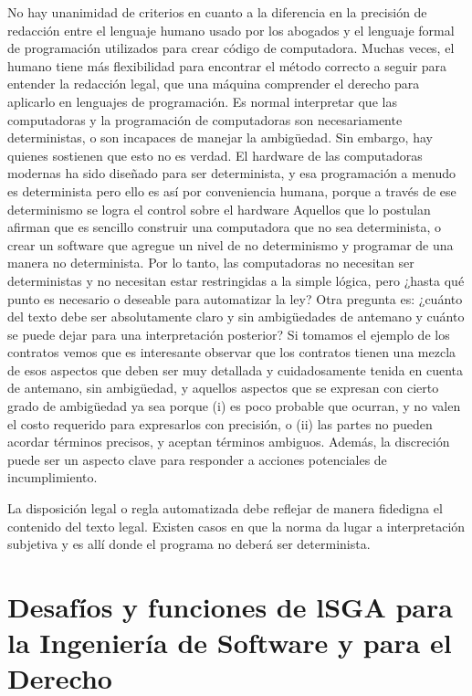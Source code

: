 \documentclass[12pt]{report} %
\begin{document}
No hay unanimidad de criterios en cuanto a la diferencia en la precisión de redacción entre el lenguaje humano usado por los abogados y el lenguaje formal de programación utilizados para crear código de computadora. Muchas veces, el humano tiene más flexibilidad para encontrar el método correcto a seguir para entender la redacción legal, que una máquina comprender el derecho para aplicarlo en lenguajes de programación. Es normal interpretar que las computadoras y la programación de computadoras son necesariamente deterministas, o son incapaces de manejar la ambigüedad. Sin embargo, hay quienes sostienen que esto no es verdad. El hardware de las computadoras modernas ha sido diseñado para ser determinista, y esa programación a menudo es determinista pero ello es así por conveniencia humana, porque a través de ese determinismo se logra el control sobre el hardware Aquellos que lo postulan afirman que es sencillo construir una computadora que no sea determinista, o crear un software que agregue un nivel de no determinismo y programar de una manera no determinista. Por lo tanto, las computadoras no necesitan ser deterministas y no necesitan estar restringidas a la simple lógica, pero ¿hasta qué punto es  necesario o deseable para automatizar la ley? Otra pregunta es: ¿cuánto del texto debe ser absolutamente claro y sin ambigüedades de antemano y cuánto se puede dejar para una interpretación posterior? Si tomamos el ejemplo de los contratos vemos que es interesante observar que los contratos tienen una mezcla de esos aspectos que deben ser muy detallada y cuidadosamente tenida en cuenta de antemano, sin ambigüedad, y aquellos aspectos que se expresan con cierto grado de ambigüedad ya sea porque (i) es poco probable que ocurran, y no valen el costo requerido para expresarlos con precisión, o (ii) las partes no pueden acordar términos precisos, y aceptan términos ambiguos. Además, la discreción puede ser un aspecto clave para responder a acciones potenciales de incumplimiento. 

La disposición legal o regla automatizada debe reflejar de manera fidedigna el contenido del texto legal. Existen casos en que la norma da lugar a interpretación subjetiva y es allí donde el programa no deberá ser determinista.

\section{Desafíos y funciones de lSGA para la Ingeniería de Software y para el Derecho }
\end{document}
